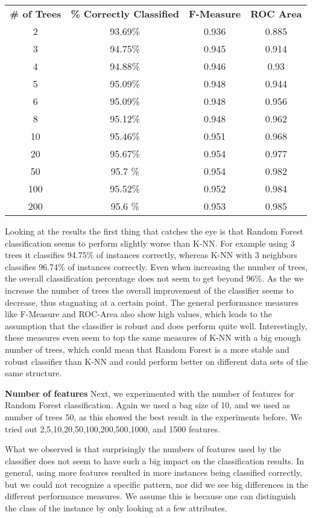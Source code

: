\documentclass{article}
\begin{document}
\begin{center}
\begin{tabular}{ c | c | c | c}
\textbf{\# of Trees} & \textbf{\% Correctly Classified} & \textbf{F-Measure} & \textbf{ROC Area}\\
2   & 93.69\% & 0.936 & 0.885\\
3   & 94.75\% & 0.945 & 0.914\\
4   & 94.88\% & 0.946 & 0.93\\
5   & 95.09\% & 0.948 & 0.944\\
6   & 95.09\% & 0.948 & 0.956\\
8   & 95.12\% & 0.948 & 0.962\\
10  & 95.46\% & 0.951 & 0.968\\
20  & 95.67\% & 0.954 & 0.977\\
50  & 95.7 \% & 0.954 & 0.982\\
100 & 95.52\% & 0.952 & 0.984\\
200 & 95.6 \% & 0.953 & 0.985\\
\end{tabular}
\end{center}

Looking at the results the first thing that catches the eye is that Random Forest classification seems to perform slightly worse than K-NN. For example using 3 trees it classifies 94.75\% of instances correctly, whereas K-NN with 3 neighbors classifies 96.74\% of instances correctly. Even when increasing the number of trees, the overall classification percentage does not seem to get beyond 96\%. As the we increase the number of trees the overall improvement of the classifier seems to decrease, thus stagnating at a certain point. The general performance measures like F-Measure and ROC-Area also show high values, which leads to the assumption that the classifier is robust and does perform quite well. Interestingly, these measures even seem to top the same measures of K-NN with a big enough number of trees, which could mean that Random Forest is a more stable and robust classifier than K-NN and could perform better on different data sets of the same structure.

\textbf{Number of features}
Next, we experimented with the number of features for Random Forest classification. Again we used a bag size of 10, and we used as number of trees 50, as this showed the best result in the experiments before. We tried out 2,5,10,20,50,100,200,500,1000, and 1500 features.

What we observed is that surprisingly the numbers of features used by the classifier does not seem to have such a big impact on the classification results. In general, using more features resulted in more instances being classified correctly, but we could not recognize a specific pattern, nor did we see big differences in the different performance measures. We assume this is because one can distinguish the class of the instance by only looking at a few attributes.
\end{document}
